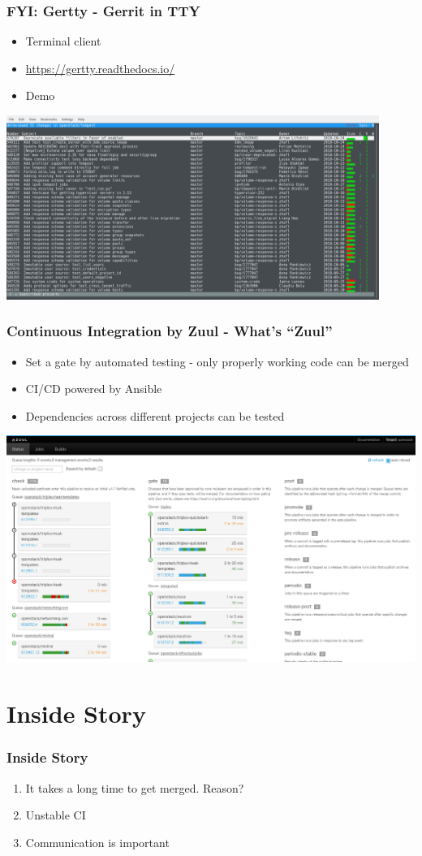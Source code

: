\documentclass[aspectratio=169,11pt,hyperref={colorlinks=true}]{beamer}
\begin{document}
\begin{frame}
  \frametitle{FYI: Gertty - Gerrit in TTY }
  \begin{itemize}
    \item Terminal client
    \item \url{https://gertty.readthedocs.io/}
    \item Demo
  \end{itemize}
  \centering
  \includegraphics[height=60mm]{images/gertty.png}
\end{frame}

\begin{frame}
  \frametitle{Continuous Integration by Zuul - What's ``Zuul''}
  \begin{itemize}
    \item Set a gate by automated testing - only properly working code can be merged
    \item CI/CD powered by Ansible
    \item Dependencies across different projects can be tested
  \end{itemize}
  \centering\includegraphics[scale=0.2]{images/zuul-status.png}
\end{frame}

\section{Inside Story}
\begin{frame}
  \frametitle{Inside Story}
  \begin{enumerate}
    \item It takes a long time to get merged. Reason?
    \item Unstable CI
    \item Communication is important
  \end{enumerate}
\end{frame}
\end{document}

